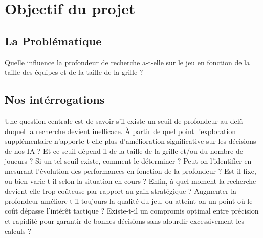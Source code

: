 \section{Objectif du projet}
\subsection{La Problématique}
Quelle influence la profondeur de recherche a-t-elle sur le jeu en fonction de la taille des équipes et de la taille de la grille ?

\subsection{Nos intérrogations}
Une question centrale est de savoir s’il existe un seuil de profondeur au-delà duquel la recherche devient inefficace. À partir de quel point l’exploration supplémentaire n’apporte-t-elle plus d’amélioration significative sur les décisions de nos IA ? Et ce seuil dépend-il de la taille de la grille et/ou du nombre de joueurs ?
Si un tel seuil existe, comment le déterminer ? Peut-on l’identifier en mesurant l’évolution des performances en fonction de la profondeur ? Est-il fixe, ou bien varie-t-il selon la situation en cours  ?
Enfin, à quel moment la recherche devient-elle trop coûteuse par rapport au gain stratégique ? Augmenter la profondeur améliore-t-il toujours la qualité du jeu, ou atteint-on un point où le coût dépasse l’intérêt tactique ? Existe-t-il un compromis optimal entre précision et rapidité pour garantir de bonnes décisions sans alourdir excessivement les calculs ?